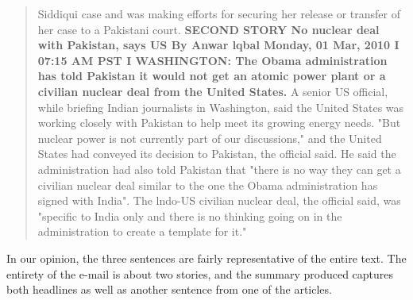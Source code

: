 \begin{quotation}
Siddiqui case and was making efforts for securing her release or transfer of her case to a Pakistani court.
\textbf{SECOND STORY
No nuclear deal with Pakistan, says US
By Anwar lqbal
Monday, 01 Mar, 2010 I 07:15 AM PST I
WASHINGTON: The Obama administration has told Pakistan it would not get an atomic power plant or a civilian nuclear
deal from the United States.}
A senior US official, while briefing Indian journalists in Washington, said the United States was working closely with
Pakistan to help meet its growing energy needs.
"But nuclear power is not currently part of our discussions," and the United States had conveyed its decision to Pakistan,
the official said.
He said the administration had also told Pakistan that "there is no way they can get a civilian nuclear deal similar to the
one the Obama administration has signed with India".
The lndo-US civilian nuclear deal, the official said, was "specific to India only and there is no thinking going on in the
administration to create a template for it."
\end{quotation}

In our opinion, the three sentences are fairly representative of the entire text.
The entirety of the e-mail is about two stories, and the summary produced captures both headlines as well as another sentence from one of the articles.